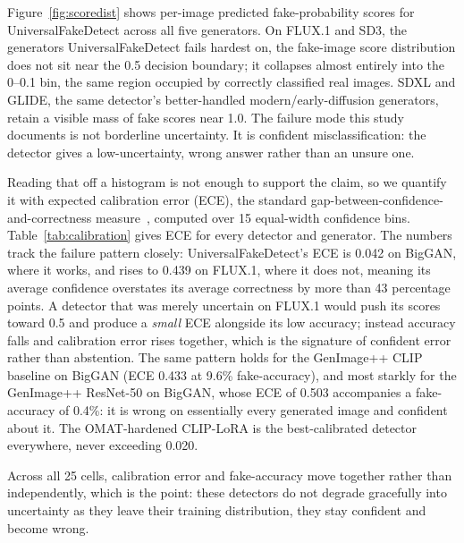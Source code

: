 \documentclass[3p,times,procedia]{elsarticle}
\begin{document}
Figure~\ref{fig:scoredist} shows per-image predicted fake-probability
scores for UniversalFakeDetect across all five generators. On FLUX.1 and
SD3, the generators UniversalFakeDetect fails hardest on, the fake-image
score distribution does not sit near the 0.5 decision boundary; it
collapses almost entirely into the 0--0.1 bin, the same region occupied by
correctly classified real images. SDXL and GLIDE, the same detector's
better-handled modern/early-diffusion generators, retain a visible mass of
fake scores near 1.0. The failure mode this study documents is not
borderline uncertainty. It is confident misclassification: the detector
gives a low-uncertainty, wrong answer rather than an unsure one.

Reading that off a histogram is not enough to support the claim, so we
quantify it with expected calibration error (ECE), the standard
gap-between-confidence-and-correctness measure~\cite{guo2017calibration},
computed over 15 equal-width confidence bins. Table~\ref{tab:calibration}
gives ECE for every detector and generator. The numbers track the failure
pattern closely: UniversalFakeDetect's ECE is 0.042 on BigGAN, where it
works, and rises to 0.439 on FLUX.1, where it does not, meaning its average
confidence overstates its average correctness by more than 43 percentage
points. A detector that was merely uncertain on FLUX.1 would push its scores
toward 0.5 and produce a \emph{small} ECE alongside its low accuracy;
instead accuracy falls and calibration error rises together, which is the
signature of confident error rather than abstention. The same pattern holds
for the GenImage++ CLIP baseline on BigGAN (ECE 0.433 at 9.6\%
fake-accuracy), and most starkly for the GenImage++ ResNet-50 on BigGAN,
whose ECE of 0.503 accompanies a fake-accuracy of 0.4\%: it is wrong on
essentially every generated image and confident about it. The OMAT-hardened
CLIP-LoRA is the best-calibrated detector everywhere, never exceeding 0.020.

Across all 25 cells, calibration error and fake-accuracy move together
rather than independently, which is the point: these detectors do not
degrade gracefully into uncertainty as they leave their training
distribution, they stay confident and become wrong.
\end{document}
